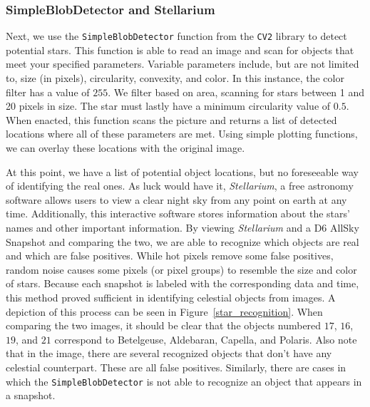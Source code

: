 \subsubsection{SimpleBlobDetector and Stellarium}

Next, we use the \texttt{SimpleBlobDetector} function from the \texttt{CV2} library to detect potential stars.
This function is able to read an image and scan for objects that meet your specified parameters.
Variable parameters include, but are not limited to, size (in pixels), circularity, convexity, and color.
In this instance, the color filter has a value of $255$.
We filter based on area, scanning for stars between 1 and 20 pixels in size.
The star must lastly have a minimum circularity value of $0.5$.
When enacted, this function scans the picture and returns a list of detected locations where all of these parameters are met.
Using simple plotting functions, we can overlay these locations with the original image.

At this point, we have a list of potential object locations, but no foreseeable way of identifying the real ones.
As luck would have it, \textit{Stellarium}, a free astronomy software allows users to view a clear night sky from any point on earth at any time.
Additionally, this interactive software stores information about the stars' names and other important information.
By viewing \textit{Stellarium} and a D6 AllSky Snapshot and comparing the two, we are able to recognize which objects are real and which are false positives.
While hot pixels remove some false positives, random noise causes some pixels (or pixel groups) to resemble the size and color of stars.
Because each snapshot is labeled with the corresponding data and time, this method proved sufficient in identifying celestial objects from images.
A depiction of this process can be seen in Figure~\ref{star_recognition}.  
When comparing the two images, it should be clear that the objects numbered $17$, $16$, $19$, and $21$ correspond to Betelgeuse, Aldebaran, Capella, and Polaris. 
Also note that in the image, there are several recognized objects that don't have any celestial counterpart.
These are all false positives.
Similarly, there are cases in which the \texttt{SimpleBlobDetector} is not able to recognize an object that appears in a snapshot.

